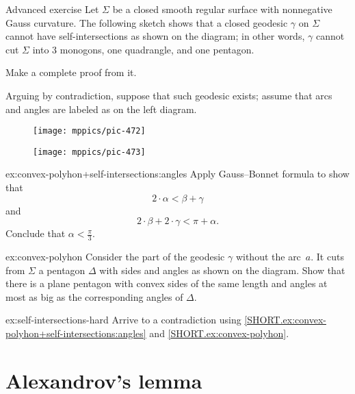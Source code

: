 \begin{thm}{Advanced exercise}\label{ex:convex-polyhon+self-intersections}
Let $\Sigma$ be a closed smooth regular surface with nonnegative Gauss curvature.
The following sketch shows that a closed geodesic $\gamma$ on $\Sigma$ cannot have self-intersections as shown on the diagram;
in other words, $\gamma$ cannot cut $\Sigma$ into 3 monogons, one quadrangle, and one pentagon. 

Make a complete proof from it.

Arguing by contradiction, suppose that such geodesic exists;
assume that arcs and angles are labeled as on the left diagram.

\begin{figure}[!ht]
\begin{minipage}{.38\textwidth}
\centering
\texttt{[image: mppics/pic-472]}
\end{minipage}\hfill
\begin{minipage}{.58\textwidth}
\centering
\texttt{[image: mppics/pic-473]}
\end{minipage}
\end{figure}

\begin{subthm}{ex:convex-polyhon+self-intersections:angles}
Apply Gauss--Bonnet formula to show that
\[2\cdot\alpha<\beta+\gamma\]
and 
\[2\cdot\beta+2\cdot \gamma<\pi+\alpha.\]
Conclude that $\alpha <\tfrac \pi 3$.
\end{subthm}

\begin{subthm}{ex:convex-polyhon}
Consider the part of the geodesic $\gamma$ without the arc~$a$.
It cuts from $\Sigma$ a pentagon $\Delta$ with sides and angles as shown on the diagram. 
Show that there is a plane pentagon with convex sides of the same length and angles at most as big as the corresponding angles of $\Delta$.
\end{subthm}

\begin{subthm}{ex:self-intersections-hard}
Arrive to a contradiction using \ref{SHORT.ex:convex-polyhon+self-intersections:angles} and \ref{SHORT.ex:convex-polyhon}. 
\end{subthm}

\end{thm}

\section{Alexandrov's lemma}

